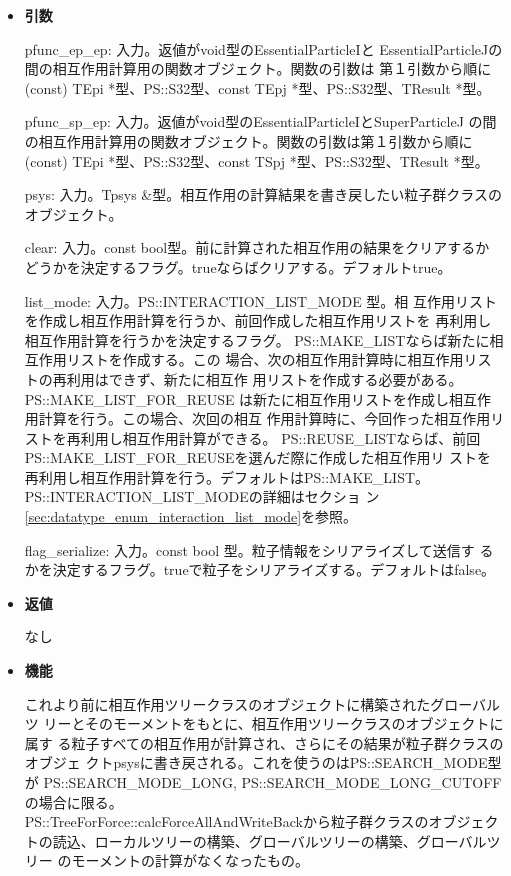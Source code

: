 \begin{itemize}

\item {\bf 引数}

pfunc\_ep\_ep: 入力。返値がvoid型のEssentialParticleIと
EssentialParticleJの間の相互作用計算用の関数オブジェクト。関数の引数は
第１引数から順に(const) TEpi *型、PS::S32型、const
TEpj *型、PS::S32型、TResult *型。

pfunc\_sp\_ep: 入力。返値がvoid型のEssentialParticleIとSuperParticleJ
の間の相互作用計算用の関数オブジェクト。関数の引数は第１引数から順に
(const) TEpi *型、PS::S32型、const TSpj *型、PS::S32型、TResult *型。

psys: 入力。Tpsys \&型。相互作用の計算結果を書き戻したい粒子群クラスの
オブジェクト。

clear: 入力。const bool型。前に計算された相互作用の結果をクリアするか
どうかを決定するフラグ。trueならばクリアする。デフォルトtrue。

list\_mode: 入力。PS::INTERACTION\_LIST\_MODE 型。相
互作用リストを作成し相互作用計算を行うか、前回作成した相互作用リストを
再利用し相互作用計算を行うかを決定するフラグ。
PS::MAKE\_LISTならば新たに相互作用リストを作成する。この
場合、次の相互作用計算時に相互作用リストの再利用はできず、新たに相互作
用リストを作成する必要がある。PS::MAKE\_LIST\_FOR\_REUSE
は新たに相互作用リストを作成し相互作用計算を行う。この場合、次回の相互
作用計算時に、今回作った相互作用リストを再利用し相互作用計算ができる。
PS::REUSE\_LISTならば、前回
PS::MAKE\_LIST\_FOR\_REUSEを選んだ際に作成した相互作用リ
ストを再利用し相互作用計算を行う。デフォルトはPS::MAKE\_LIST。
PS::INTERACTION\_LIST\_MODEの詳細はセクショ
ン\ref{sec:datatype_enum_interaction_list_mode}を参照。

flag\_serialize: 入力。const bool 型。粒子情報をシリアライズして送信す
るかを決定するフラグ。trueで粒子をシリアライズする。デフォルトはfalse。

\item {\bf 返値}

なし

\item {\bf 機能}

これより前に相互作用ツリークラスのオブジェクトに構築されたグローバルツ
リーとそのモーメントをもとに、相互作用ツリークラスのオブジェクトに属す
る粒子すべての相互作用が計算され、さらにその結果が粒子群クラスのオブジェ
クトpsysに書き戻される。これを使うのはPS::SEARCH\_MODE型が
PS::SEARCH\_MODE\_LONG, PS::SEARCH\_MODE\_LONG\_CUTOFFの場合に限る。\\
PS::TreeForForce::calcForceAllAndWriteBackから粒子群クラスのオブジェク
トの読込、ローカルツリーの構築、グローバルツリーの構築、グローバルツリー
のモーメントの計算がなくなったもの。


\end{itemize}
